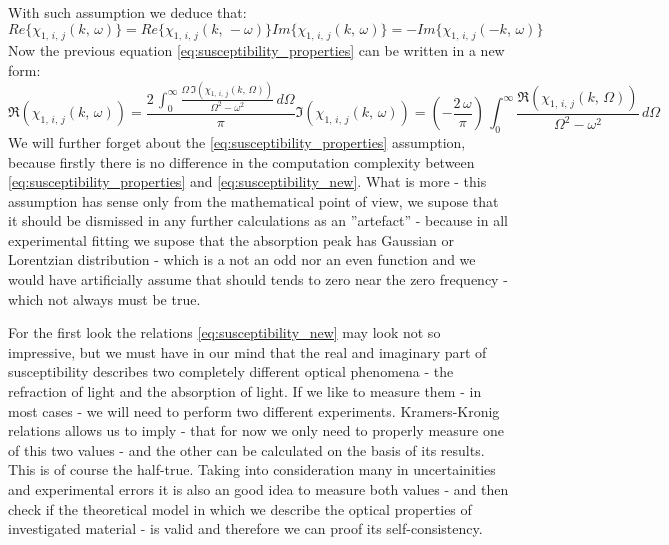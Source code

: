 \documentclass[12pt,twoside,a4paper]{article}
\numberwithin{equation}{subsection}
\numberwithin{figure}{subsection}
\begin{document}
With such assumption we deduce that:
\begin{subequations} \label{eq:susceptibility_deduces}
  \begin{equation}   \label{eq:sdeduces_Re}
     Re \{ {\chi_{1, \,i, \,j}} (k, \,\omega ) \} =  Re \{ {\chi_{1, \,i, \,j}}(  k, \, -\omega ) \}
  \end{equation}
  \begin{equation}   \label{eq:sdeduces_Im}
     Im \{ {\chi_{1, \,i, \,j}} (k, \,\omega ) \} = -Im \{ {\chi_{1, \,i, \,j}}( -k, \,  \omega ) \}
  \end{equation}
\end{subequations}
Now the previous equation \ref{eq:susceptibility_properties} can be written in a new form:
\begin{subequations} \label{eq:susceptibility_new}
  \begin{equation}   \label{eq:snew_Re}
     \Re ({\chi_{1, \,i, \,j}}(k, \,\omega ))=\frac {2\,\int_{0}^{\infty }
     \frac {\Omega \,\Im ({\chi_{1, \,i, \,j}}(k, \,\Omega ))}{\Omega ^{2} - \omega ^{2}}\,d\Omega }{\pi }
  \end{equation}
  \begin{equation}   \label{eq:snew_Im}
     \Im ({\chi_{1, \,i, \,j}}(k, \,\omega ))=( - \frac {2\,\omega }{\pi })\,\int_{0}^{\infty }
     \frac {\Re ({\chi_{1, \,i, \,j}}(k, \,\Omega ))}{\Omega ^{2} - \omega ^{2}}\,d\Omega
  \end{equation}
\end{subequations}
We will further forget about the \ref{eq:susceptibility_properties} assumption, because firstly there is no difference in the computation
complexity between \ref{eq:susceptibility_properties} and \ref{eq:susceptibility_new}. What is more - this assumption has sense
only from the mathematical point of view, we supose that it should be dismissed in any further calculations as an ''artefact'' - because in
all experimental fitting we supose that the absorption peak has Gaussian or Lorentzian distribution - which is a not an odd nor an
even function and we would have artificially assume that should tends to zero near the zero frequency - which not always must be true.

For the first look the relations  \ref{eq:susceptibility_new} may look not so impressive, but we must have in our mind that the real and imaginary
part of susceptibility describes two completely different optical phenomena - the refraction of light and the absorption of light. If we
like to measure them - in most cases - we will need to perform two different experiments. Kramers-Kronig relations allows us to imply -
that for now we only need to properly measure one of this two values - and the other can be calculated on the basis of its results. This is
of course the half-true. Taking into consideration many in uncertainities and experimental errors it is also an good idea to
measure both values - and then check if the theoretical model in which we describe the optical properties of investigated material - is valid and therefore we can proof its self-consistency.
\end{document}
